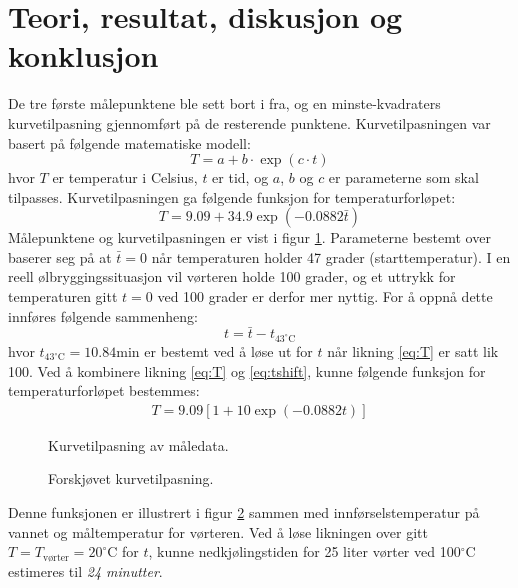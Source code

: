 \documentclass[a4paper]{article}
\newlength\figureheight
\newlength\figurewidth
\newcommand{\tikzfig}[3]{\footnotesize 
\setlength\figurewidth{#2} 
\setlength\figureheight{#3}
}
\begin{document}
\section{Teori, resultat, diskusjon og konklusjon}
De tre første målepunktene ble sett bort i fra, og en minste-kvadraters kurvetilpasning gjennomført på de resterende punktene. Kurvetilpasningen var basert på følgende matematiske modell:
\begin{equation}
T = a+b\cdot \exp(c\cdot t)
\end{equation}
hvor $T$ er temperatur i Celsius, $t$ er tid, og $a$, $b$ og $c$ er parameterne som skal tilpasses. Kurvetilpasningen ga følgende funksjon for temperaturforløpet:
\begin{equation} \label{eq:T}
T = 9.09 + 34.9 \exp(-0.0882 \bar{t})
\end{equation}
Målepunktene og kurvetilpasningen er vist i figur \ref{fig:Fig1}. Parameterne bestemt over baserer seg på at $\bar{t}=0$ når temperaturen holder 47 grader (starttemperatur). I en reell ølbryggingssituasjon vil vørteren holde 100 grader, og et uttrykk for temperaturen gitt $t=0$ ved 100 grader er derfor mer nyttig. For å oppnå dette innføres følgende sammenheng:
%
\begin{equation} \label{eq:tshift}
t=\bar{t} - t_{43^\circ\text{C}}
\end{equation}
hvor $t_{43^\circ\text{C}}=10.84 \text{min}$ er bestemt ved å løse ut for $t$ når likning \ref{eq:T} er satt lik 100. Ved å kombinere likning \ref{eq:T} og \ref{eq:tshift}, kunne følgende funksjon for temperaturforløpet bestemmes:
\begin{gather}
T = 9.09 [1 + 10 \exp(-0.0882 t)]
\end{gather}

\begin{figure}
\centering
\tikzfig{Fig1}{0.75\linewidth}{5cm}
\caption{Kurvetilpasning av måledata.}
\label{fig:Fig1}
\end{figure}

\begin{figure}
\centering
\tikzfig{Fig2}{0.75\linewidth}{5cm}
\caption{Forskjøvet kurvetilpasning.}
\label{fig:Fig2}
\end{figure}
%
Denne funksjonen er illustrert i figur \ref{fig:Fig2} sammen med innførselstemperatur på vannet og måltemperatur for vørteren. Ved å løse likningen over gitt $T=T_{\text{vørter}} = 20 ^\circ\text{C}$ for $t$, kunne nedkjølingstiden for 25 liter vørter ved 100$^\circ$C estimeres til \textit{24 minutter}.
\end{document}
